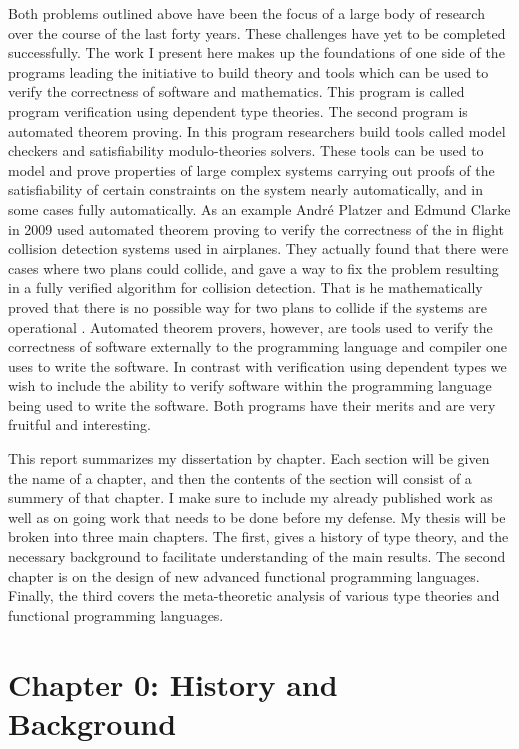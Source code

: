Both problems outlined above have been the focus of a large body of
research over the course of the last forty years.  These challenges
have yet to be completed successfully.  The work I present here makes
up the foundations of one side of the programs leading the initiative
to build theory and tools which can be used to verify the correctness
of software and mathematics.  This program is called program
verification using dependent type theories.  The second program is
automated theorem proving.  In this program researchers build tools
called model checkers and satisfiability modulo-theories solvers.
These tools can be used to model and prove properties of large complex
systems carrying out proofs of the satisfiability of certain
constraints on the system nearly automatically, and in some cases
fully automatically.  As an example Andr\'{e} Platzer and Edmund
Clarke in 2009 used automated theorem proving to verify the
correctness of the in flight collision detection systems used in
airplanes.  They actually found that there were cases where two plans
could collide, and gave a way to fix the problem resulting in a fully
verified algorithm for collision detection.  That is he mathematically
proved that there is no possible way for two plans to collide if the
systems are operational \cite{DBLP:conf/fm/PlatzerC09}.  Automated
theorem provers, however, are tools used to verify the correctness of
software externally to the programming language and compiler one uses
to write the software.  In contrast with verification using dependent
types we wish to include the ability to verify software within the
programming language being used to write the software. Both programs
have their merits and are very fruitful and interesting.

This report summarizes my dissertation by chapter.  Each section will
be given the name of a chapter, and then the contents of the section
will consist of a summery of that chapter.  I make sure to include my
already published work as well as on going work that needs to be done
before my defense.  My thesis will be broken into three main chapters.
The first, gives a history of type theory, and the necessary
background to facilitate understanding of the main results. The second
chapter is on the design of new advanced functional programming
languages.  Finally, the third covers the meta-theoretic analysis of
various type theories and functional programming languages.

\section{Chapter 0: History and Background}
\label{sec:history_and_background}

